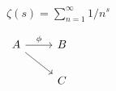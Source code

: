 \documentclass[dvisvgm]{article}
\begin{document}
\begin{preview}$\zeta(s) = \sum\limits_{n=1}^\infty 1 / n^s$\end{preview}
\begin{preview}$\begin{tikzcd} A \arrow[rd] \arrow[r, "\phi"] & B \\ & C\end{tikzcd}$\end{preview}
\end{document}
